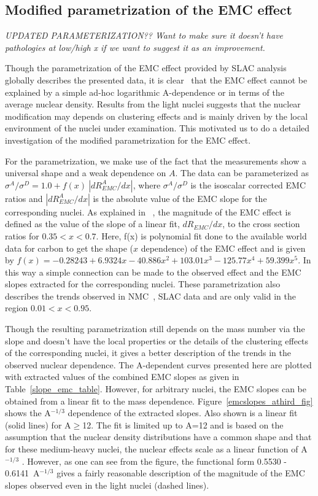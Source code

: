 \subsection{Modified parametrization of the EMC effect}\label{emcparam.ssec}

\textit{UPDATED PARAMETERIZATION??  Want to make sure it doesn't have
pathologies at low/high x if we want to suggest it as an improvement.}

Though the parametrization of the EMC effect provided by SLAC
analysis~\cite{slace139} globally describes the presented data, it is
clear~\cite{seely09, arrington12c} that the EMC effect cannot be explained by a
simple ad-hoc logarithmic A-dependence or in terms of the average nuclear
density. Results from the light nuclei suggests that the nuclear modification
may depends on clustering effects and is mainly driven by the local
environment of the nuclei under examination. This motivated us to do a
detailed investigation of the modified parametrization for the EMC effect.

For the parametrization, we make use of the fact that the measurements show a
universal shape and a weak dependence on $A$. The data can be parameterized as
$\sigma{^A}/\sigma{^D}= 1.0 + f(x)~|dR^{A}_{EMC}/dx|$, where 
$\sigma{^A}/\sigma{^D}$ is the isoscalar corrected EMC ratios and
$|dR^{A}_{EMC}/dx|$ is the absolute value of the EMC slope for the
corresponding nuclei. As explained in ~\cite{seely09}, the magnitude of the
EMC effect is defined as the value of the slope of a linear fit,
$dR_{EMC}/dx$, to the cross section ratios for $0.35 < x < 0.7$. Here, f(x) is
polynomial fit done to the available world data for carbon to get the shape
($x$ dependence) of the EMC effect and is given by $f(x)= -0.28243 + 6.9324x
- 40.886x{^2} + 103.01x{^3} - 125.77x{^4} + 59.399x{^5}$. In this way a simple
connection can be made to the observed effect and the EMC slopes extracted for
the corresponding nuclei. These parametrization also describes the trends
observed in NMC~\cite{Amaudruz:1995tq,Arneodo:1995cs}, SLAC\cite{slace139}
data and are only valid in the region $0.01< x < 0.95$.


Though the resulting parametrization still depends on the mass number via the
slope and doesn't have the local properties or the details of the clustering
effects of the corresponding nuclei, it gives a better description of the
trends in the observed nuclear dependence. The A-dependent curves presented
here are plotted with extracted values of the combined EMC slopes as given in
Table~\ref{slope_emc_table}. However, for arbitrary nuclei, the EMC slopes
can be obtained from a linear fit to the mass dependence.
Figure~\ref{emcslopes_athird_fig} shows the A$^{-1/3}$ dependence of the
extracted slopes. Also shown is a linear fit (solid lines) for A$\geq$12.
The fit is limited up to A=12 and is based on the assumption that the nuclear
density distributions have a common shape and that for these medium-heavy
nuclei, the nuclear effects scale as a linear function of A$^{-1/3}$
\cite{sick_day_nucmatter,arrington12c}. However, as one can see from the
figure, the functional form 0.5530 - 0.6141~A$^{-1/3}$ gives a fairly
reasonable description of the magnitude of the EMC slopes observed even in the
light nuclei (dashed lines).

